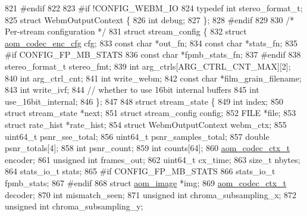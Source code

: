 \begin{DoxyCodeInclude}
{{{{{{{{{821 \textcolor{preprocessor}{#endif}
822 
823 \textcolor{preprocessor}{#if !CONFIG\_WEBM\_IO}
824 \textcolor{keyword}{typedef} \textcolor{keywordtype}{int} stereo\_format\_t;
825 \textcolor{keyword}{struct }WebmOutputContext \{
826   \textcolor{keywordtype}{int} debug;
827 \};
828 \textcolor{preprocessor}{#endif}
829 
830 \textcolor{comment}{/* Per-stream configuration */}
831 \textcolor{keyword}{struct }stream\_config \{
832   \textcolor{keyword}{struct }\hyperlink{structaom__codec__enc__cfg}{aom\_codec\_enc\_cfg} cfg;
833   \textcolor{keyword}{const} \textcolor{keywordtype}{char} *out\_fn;
834   \textcolor{keyword}{const} \textcolor{keywordtype}{char} *stats\_fn;
835 \textcolor{preprocessor}{#if CONFIG\_FP\_MB\_STATS}
836   \textcolor{keyword}{const} \textcolor{keywordtype}{char} *fpmb\_stats\_fn;
837 \textcolor{preprocessor}{#endif}
838   stereo\_format\_t stereo\_fmt;
839   \textcolor{keywordtype}{int} arg\_ctrls[ARG\_CTRL\_CNT\_MAX][2];
840   \textcolor{keywordtype}{int} arg\_ctrl\_cnt;
841   \textcolor{keywordtype}{int} write\_webm;
842   \textcolor{keyword}{const} \textcolor{keywordtype}{char} *film\_grain\_filename;
843   \textcolor{keywordtype}{int} write\_ivf;
844   \textcolor{comment}{// whether to use 16bit internal buffers}
845   \textcolor{keywordtype}{int} use\_16bit\_internal;
846 \};
847 
848 \textcolor{keyword}{struct }stream\_state \{
849   \textcolor{keywordtype}{int} index;
850   \textcolor{keyword}{struct }stream\_state *next;
851   \textcolor{keyword}{struct }stream\_config config;
852   FILE *file;
853   \textcolor{keyword}{struct }rate\_hist *rate\_hist;
854   \textcolor{keyword}{struct }WebmOutputContext webm\_ctx;
855   uint64\_t psnr\_sse\_total;
856   uint64\_t psnr\_samples\_total;
857   \textcolor{keywordtype}{double} psnr\_totals[4];
858   \textcolor{keywordtype}{int} psnr\_count;
859   \textcolor{keywordtype}{int} counts[64];
860   \hyperlink{structaom__codec__ctx}{aom\_codec\_ctx\_t} encoder;
861   \textcolor{keywordtype}{unsigned} \textcolor{keywordtype}{int} frames\_out;
862   uint64\_t cx\_time;
863   \textcolor{keywordtype}{size\_t} nbytes;
864   stats\_io\_t stats;
865 \textcolor{preprocessor}{#if CONFIG\_FP\_MB\_STATS}
866   stats\_io\_t fpmb\_stats;
867 \textcolor{preprocessor}{#endif}
868   \textcolor{keyword}{struct }\hyperlink{structaom__image}{aom\_image} *img;
869   \hyperlink{structaom__codec__ctx}{aom\_codec\_ctx\_t} decoder;
870   \textcolor{keywordtype}{int} mismatch\_seen;
871   \textcolor{keywordtype}{unsigned} \textcolor{keywordtype}{int} chroma\_subsampling\_x;
872   \textcolor{keywordtype}{unsigned} \textcolor{keywordtype}{int} chroma\_subsampling\_y;
}}}}}}}}}
\end{DoxyCodeInclude}
